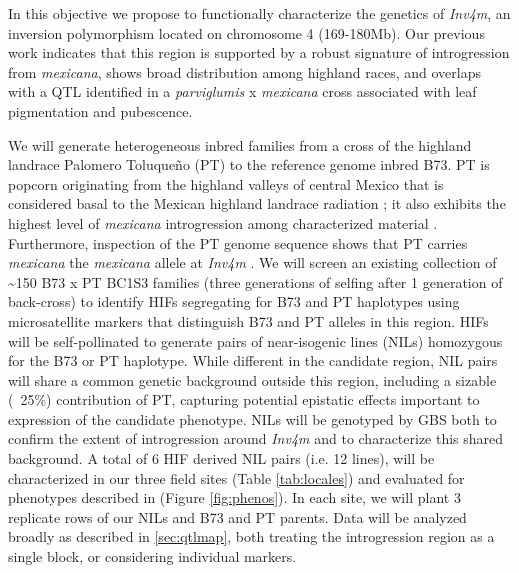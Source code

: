 In this objective we propose to functionally characterize the genetics of \emph{Inv4m}, an inversion polymorphism located on chromosome 4 (169-180Mb). Our previous work \citep{Hufford2013, Pyhajarvi2013} indicates that this region is supported by a robust signature of introgression from \emph{mexicana}, shows broad distribution among highland races, and overlaps with a QTL identified in a \emph{parviglumis} x \emph{mexicana} cross  \citep{Lauter2004a} associated with leaf pigmentation and pubescence. %


We will generate heterogeneous inbred families \citep[HIFs;][]{tuinstra1997heterogeneous} from a cross of the highland landrace Palomero Toluque\~no (PT) to the reference genome inbred B73.  PT is popcorn originating from the highland valleys of central Mexico that is considered basal to the Mexican highland landrace radiation \citep{reif2006grouping}; it also exhibits the highest level of \emph{mexicana} introgression among characterized material \citep{Matsuoka2002}. Furthermore, inspection of the PT genome sequence \citep{Vielle-Calzada2009} shows that PT carries \emph{mexicana} the \emph{mexicana} allele at \emph{Inv4m} \citep{Hufford2013}. We will screen an existing collection of \textasciitilde 150 B73 x PT BC1S3 families (three generations of selfing after 1 generation of back-cross)  to identify HIFs segregating for B73 and PT haplotypes using microsatellite markers that distinguish B73 and PT alleles in this region. HIFs will be self-pollinated to generate pairs of near-isogenic lines (NILs) homozygous for the B73 or PT haplotype. While different in the candidate region, NIL pairs will share a common genetic background outside this region, including a sizable (~25\%) contribution of PT, capturing potential epistatic effects important to expression of the candidate phenotype. NILs will be genotyped by GBS  both to confirm the extent of introgression around \emph{Inv4m} and to characterize this shared background. A total of 6 HIF derived NIL pairs (i.e. 12 lines), will be characterized in our three field sites (Table \ref{tab:locales}) and evaluated for phenotypes described in (Figure \ref{fig:phenos}). In each site, we will plant 3 replicate rows of our NILs and B73 and PT parents. Data will be analyzed broadly as described in \ref{sec:qtlmap}, both treating the introgression region as a single block, or considering individual markers.

